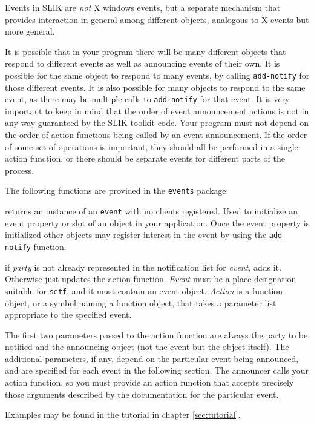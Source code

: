 \documentclass[twoside,openright,11pt]{report}
\newcommand{\tp}[1]{\texttt{#1}}
\begin{document}
Events in SLIK are \emph{not} X windows events, but a separate
mechanism that provides interaction in general among different
objects, analogous to X events but more general.

It is possible that in your program there will be many different
objects that respond to different events as well as announcing events
of their own.  It is possible for the same object to respond to many
events, by calling \tp{add-notify} for those different events.  It is
also possible for many objects to respond to the same event, as there
may be multiple calls to \tp{add-notify} for that event.  It is very
important to keep in mind that the order of event announcement actions
is not in any way guaranteed by the SLIK toolkit code.  Your program
must not depend on the order of action functions being called by an
event announcement.  If the order of some set of operations is
important, they should all be performed in a single action function,
or there should be separate events for different parts of the process.

The following functions are provided in the \tp{events} package:

{returns an instance of an \tp{event} with no clients registered.
Used to initialize an event property or slot of an object in your
application.  Once the event property is initialized other objects may
register interest in the event by using the \tp{add-notify} function.}

{if \emph{party} is not already represented in the notification list
for \emph{event}, adds it.  Otherwise just updates the action
function.  \emph{Event} must be a place designation suitable for
\tp{setf}, and it must contain an event object.  \emph{Action} is a
function object, or a symbol naming a function object, that takes a
parameter list appropriate to the specified event.}

The first two parameters passed to the action function are always the
party to be notified and the announcing object (not the event but the
object itself).  The additional parameters, if any, depend on the
particular event being announced, and are specified for each event in
the following section.  The announcer calls your action function, so
you must provide an action function that accepts precisely those
arguments described by the documentation for the particular event.

Examples may be found in the tutorial in chapter \ref{sec:tutorial}.
\end{document}

